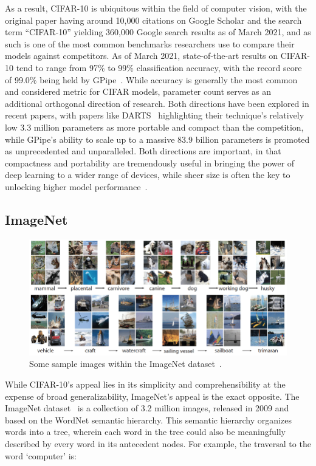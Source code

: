 As a result, CIFAR-10 is ubiquitous within the field of computer vision, with the original paper having around 10,000
citations on Google Scholar and the search term ``CIFAR-10'' yielding 360,000 Google search results as of March 2021,
and as such is one of the most common benchmarks researchers use to compare their models against competitors. As
of March 2021, state-of-the-art results on CIFAR-10 tend to range from 97\% to 99\% classification accuracy, with the
record score of 99.0\% being held by GPipe~\citep{huang2018}. While accuracy is generally the most common and considered
metric for CIFAR models, parameter count serves as an additional orthogonal direction of research. Both directions have
been explored in recent papers, with papers like DARTS~\citep{liu2018} highlighting their technique's relatively low 3.3
million parameters as more portable and compact than the competition, while GPipe's ability to scale up to a massive 83.9
billion parameters is promoted as unprecedented and unparalleled. Both directions are important, in that compactness
and portability are tremendously useful in bringing the power of deep learning to a wider range of devices, while sheer
size is often the key to unlocking higher model performance~\citep{tan2019}.

\subsection{ImageNet}
\begin{figure}[htbp!]
\centering
\includegraphics[width=1\textwidth]{data/imagenet_sample}
\caption[Sample ImageNet images]{Some sample images within the ImageNet dataset~\citep{ye2018}.}
\label{fig:imagenet}
\end{figure}
While CIFAR-10's appeal lies in its simplicity and comprehensibility at the expense of broad generalizability, ImageNet's
appeal is the exact opposite.
The ImageNet dataset~\citep{deng2009,deng2014} is a collection of 3.2 million images, released in 2009 and based on the
WordNet semantic hierarchy. This semantic hierarchy organizes words into a tree, wherein each word in the tree could also
be meaningfully described by every word in its antecedent nodes. For example, the traversal to the word `computer' is:

